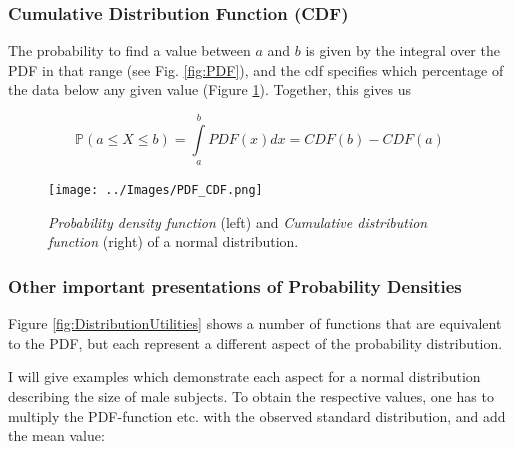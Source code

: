 \subsubsection{Cumulative Distribution Function (CDF)}

The probability to find a value between $a$ and $b$ is given by the integral over the PDF in that range (see Fig. \ref{fig:PDF}), and the \acrfull{cdf} specifies which percentage of the data below any given value (Figure \ref{fig:CDF}). Together, this gives us

\begin{equation}
   \mathbb{P}(a \leq X \leq b) = \int\limits_a^b {PDF(x)dx} = CDF(b) - CDF(a)
\end{equation}


\begin{figure}[ht]
  \centering
  \texttt{[image: ../Images/PDF\_CDF.png]}\\
  \caption{\emph{Probability density function} (left) and \emph{Cumulative distribution function} (right) of a normal distribution.}\label{fig:CDF}
\end{figure}

\subsubsection{Other important presentations of Probability Densities}

Figure \ref{fig:DistributionUtilities} shows a number of functions that are equivalent to the PDF, but each represent a different aspect of the probability distribution.

I will give examples which demonstrate each aspect for a normal distribution describing the size of male subjects. To obtain the respective values, one has to multiply the PDF-function etc. with the observed standard distribution, and add the mean value:


